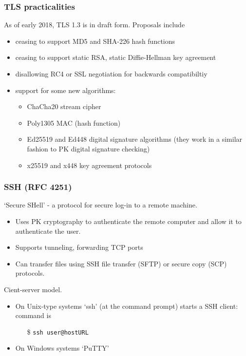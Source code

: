 \documentclass[10pt, hyperref={pdfpagelabels=false}]{beamer}
\begin{document}
\begin{frame}
\frametitle{TLS practicalities}
As of early 2018, TLS 1.3 is in draft form. Proposals include
\begin{itemize}
\item ceasing to support MD5 and SHA-226 hash functions
\item ceasing to support static RSA, static Diffie-Hellman key agreement
\item disallowing RC4 or SSL negotiation for backwards compatibiltiy
\item support for some new algorithms:
  \begin{itemize}
  \item ChaCha20 stream cipher
  \item Poly1305 MAC (hash function)
  \item Ed25519 and Ed448 digital signature algorithms (they work in a similar fashion to PK digital signature checking)
  \item  x25519 and x448 key agreement protocols
  \end{itemize}  
\end{itemize}  
\end{frame}

\begin{frame}
\frametitle{SSH (RFC 4251)}
`Secure SHell' - a protocol for secure log-in to a remote machine.
\begin{itemize}
\item Uses PK cryptography to authenticate the remote computer and allow it to authenticate the user.
\item Supports tunneling, forwarding TCP ports 
\item Can transfer files using SSH file transfer (SFTP) or secure copy (SCP) protocols.
\end{itemize}  

Cient-server model.
\begin{itemize}
\item On Unix-type systems `ssh' (at the command prompt) starts a SSH client: command is
  \begin{itemize}
  \item[\$] \texttt{ssh user@hostURL}
  \end{itemize}  
\item On Windows systems `PuTTY' 
\end{itemize}  
\end{frame}
\end{document}
